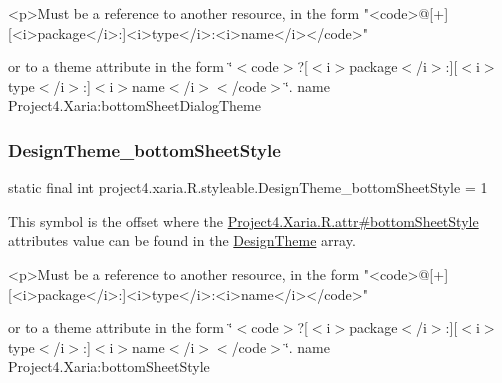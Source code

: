 \begin{DoxyVerb}      <p>Must be a reference to another resource, in the form "<code>@[+][<i>package</i>:]<i>type</i>:<i>name</i></code>"
\end{DoxyVerb}
 or to a theme attribute in the form \char`\"{}$<$code$>$?\mbox{[}$<$i$>$package$<$/i$>$\+:\mbox{]}\mbox{[}$<$i$>$type$<$/i$>$\+:\mbox{]}$<$i$>$name$<$/i$>$$<$/code$>$\char`\"{}.  name Project4.\+Xaria\+:bottom\+Sheet\+Dialog\+Theme \mbox{\label{classproject4_1_1xaria_1_1R_1_1styleable_abc176fafc34aad2467941c85f699cb37}} 
\subsubsection{\texorpdfstring{Design\+Theme\+\_\+bottom\+Sheet\+Style}{DesignTheme\_bottomSheetStyle}}
{\footnotesize\ttfamily static final int project4.\+xaria.\+R.\+styleable.\+Design\+Theme\+\_\+bottom\+Sheet\+Style = 1\hspace{0.3cm}{\ttfamily [static]}}

This symbol is the offset where the \hyperlink{}{Project4.\+Xaria.\+R.\+attr\#bottom\+Sheet\+Style} attribute\textquotesingle{}s value can be found in the \hyperlink{classproject4_1_1xaria_1_1R_1_1styleable_a190554b7e28f27d85d823a1301dd3cf5}{Design\+Theme} array.

\begin{DoxyVerb}      <p>Must be a reference to another resource, in the form "<code>@[+][<i>package</i>:]<i>type</i>:<i>name</i></code>"
\end{DoxyVerb}
 or to a theme attribute in the form \char`\"{}$<$code$>$?\mbox{[}$<$i$>$package$<$/i$>$\+:\mbox{]}\mbox{[}$<$i$>$type$<$/i$>$\+:\mbox{]}$<$i$>$name$<$/i$>$$<$/code$>$\char`\"{}.  name Project4.\+Xaria\+:bottom\+Sheet\+Style \mbox{\label{classproject4_1_1xaria_1_1R_1_1styleable_ae4d0323b8c38346ddb8722e9bf22d47f}} 
